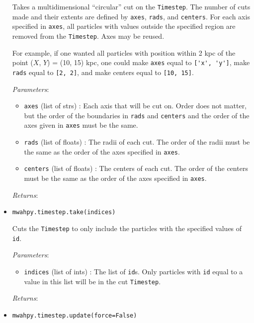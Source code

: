 \documentclass{article}
\begin{document}
\begin{itemize}
Takes a multidimensional ``circular'' cut on the \verb!Timestep!. The number of cuts made and their extents are defined by \verb!axes!, \verb!rads!, and \verb!centers!. For each axis specified in \verb!axes!, all particles with values outside the specified region are removed from the \verb!Timestep!. Axes may be reused.

For example, if one wanted all particles with position within 2 kpc of the point ($X$, $Y$) = (10, 15) kpc, one could make \verb!axes! equal to \verb!['x', 'y']!, make \verb!rads! equal to \verb![2, 2]!, and make centers equal to \verb![10, 15]!.

\textit{Parameters}: \begin{itemize}

\item \verb!axes! (list of strs) : Each axis that will be cut on. Order does not matter, but the order of the boundaries in \verb!rads! and \verb!centers! and the order of the axes given in \verb!axes! must be the same.

\item \verb!rads! (list of floats) : The radii of each cut. The order of the radii must be the same as the order of the axes specified in \verb!axes!.

\item \verb!centers! (list of floats) : The centers of each cut. The order of the centers must be the same as the order of the axes specified in \verb!axes!.

\end{itemize}

\textit{Returns}: 



\item \verb!mwahpy.timestep.take(indices)!

Cuts the \verb!Timestep! to only include the particles with the specified values of \verb!id!.

\textit{Parameters}: \begin{itemize}

\item \verb!indices! (list of ints) : The list of \verb!id!s. Only particles with \verb!id! equal to a value in this list will be in the cut \verb!Timestep!.

\end{itemize}

\textit{Returns}: 



\item \verb!mwahpy.timestep.update(force=False)!


\end{itemize}
\end{document}
